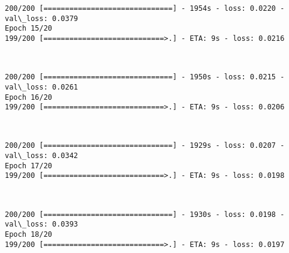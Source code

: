 \documentclass[11pt]{article}
\begin{document}
    \begin{Verbatim}[commandchars=\\\{\}]
200/200 [==============================] - 1954s - loss: 0.0220 - val\_loss: 0.0379
Epoch 15/20
199/200 [============================>.] - ETA: 9s - loss: 0.0216 
    \end{Verbatim}

    \begin{center}
    \end{center}
    { \hspace*{\fill} \\}
    
    \begin{Verbatim}[commandchars=\\\{\}]
200/200 [==============================] - 1950s - loss: 0.0215 - val\_loss: 0.0261
Epoch 16/20
199/200 [============================>.] - ETA: 9s - loss: 0.0206 
    \end{Verbatim}

    \begin{center}
    \end{center}
    { \hspace*{\fill} \\}
    
    \begin{Verbatim}[commandchars=\\\{\}]
200/200 [==============================] - 1929s - loss: 0.0207 - val\_loss: 0.0342
Epoch 17/20
199/200 [============================>.] - ETA: 9s - loss: 0.0198 
    \end{Verbatim}

    \begin{center}
    \end{center}
    { \hspace*{\fill} \\}
    
    \begin{Verbatim}[commandchars=\\\{\}]
200/200 [==============================] - 1930s - loss: 0.0198 - val\_loss: 0.0393
Epoch 18/20
199/200 [============================>.] - ETA: 9s - loss: 0.0197 
    \end{Verbatim}

    \begin{center}
    \end{center}
    { \hspace*{\fill} \\}
    
\end{document}
